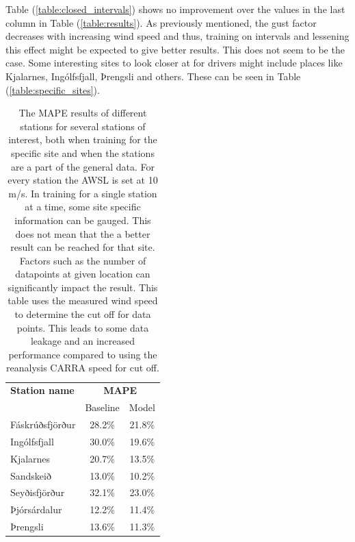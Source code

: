 Table (\ref{table:closed_intervals}) shows no improvement over the values in the last column in Table (\ref{table:results}). As previously mentioned, the gust factor decreases with increasing wind speed and thus, training on intervals and lessening this effect might be expected to give better results. This does not seem to be the case. Some interesting sites to look closer at for drivers might include places like Kjalarnes, Ingólfsfjall, Þrengsli and others. These can be seen in Table (\ref{table:specific_sites}).

\begin{table}[h]
    \caption[Model result by stations of interest]{The MAPE results of different stations for several stations of interest, both when training for the specific site and when the stations are a part of the general data. For every station the AWSL is set at 10 m/s. In training for a single station at a time, some site specific information can be gauged. This does not mean that the a better result can be reached for that site. Factors such as the number of datapoints at given location can significantly impact the result. This table uses the measured wind speed to determine the cut off for data points. This leads to some data leakage and an increased performance compared to using the reanalysis CARRA speed for cut off.}
    \label{table:more_specific_sites}
    \centering
    \begin{tabular}{lcc}
        \toprule
        \textbf{Station name} & \multicolumn{2}{c}{\textbf{MAPE}}\\
         & Baseline & Model\\
        \midrule
        Fáskrúðsfjörður & 28.2\% & 21.8\%\\
        Ingólfsfjall & 30.0\% & 19.6\%\\
        Kjalarnes & 20.7\% & 13.5\% \\
        Sandskeið & 13.0\% & 10.2\%\\
        Seyðisfjörður & 32.1\% & 23.0\%\\
        Þjórsárdalur & 12.2\% & 11.4\%\\
        Þrengsli & 13.6\% & 11.3\%\\
        \bottomrule
    \end{tabular}
\end{table}

